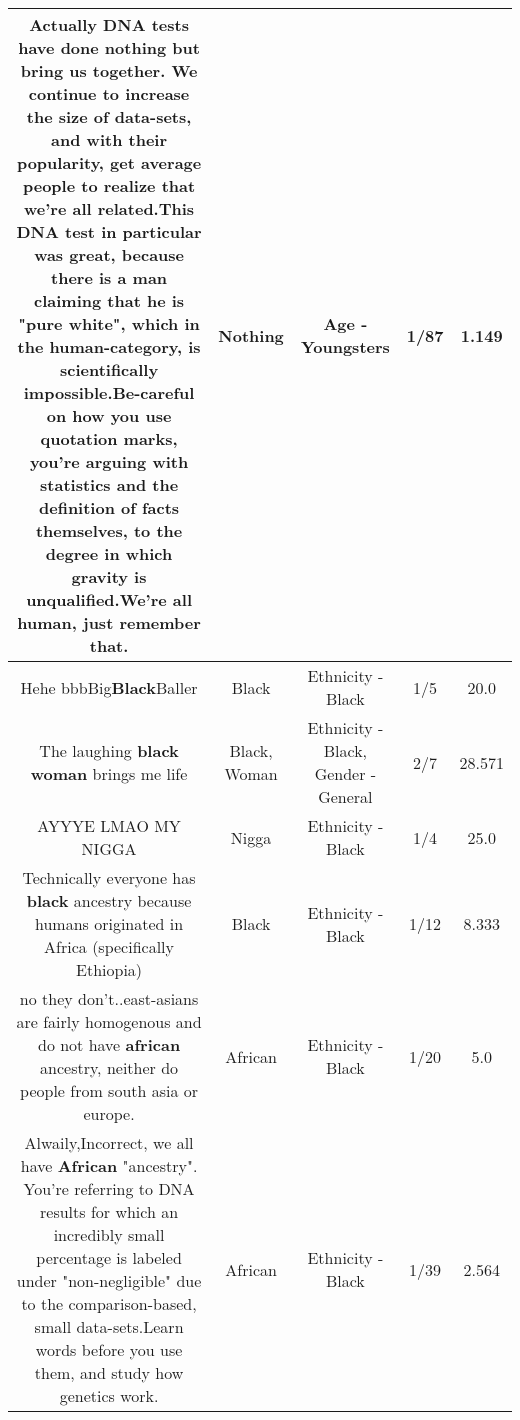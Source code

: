 \documentclass[11pt]{article}
\newlength\mylength
\begin{document}
\begin{center}
\begin{longtable}{|C{.65\mylength}|C{.30\mylength}|C{.12\mylength}|C{.12\mylength}|C{.12\mylength}|}
  \small Actually DNA tests have done \textbf{nothing} but bring us together. We continue to increase the size of data-sets, and with their popularity, get average people to realize that we're all related.This DNA test in particular was great, because there is a man claiming that he is "pure white", which in the human-category, is scientifically impossible.Be-careful on how you use quotation marks, you're arguing with statistics and the definition of facts themselves, to the degree in which gravity is unqualified.We're all human, just remember that.\normalsize   & Nothing & Age - Youngsters & 1/87 & 1.149 \\  \hline
  \small Hehe bbbBig\textbf{Black}Baller\normalsize   & Black & Ethnicity - Black & 1/5 & 20.0 \\  \hline
  \small The laughing \textbf{black} \textbf{woman} brings me life\normalsize   & Black, Woman & Ethnicity - Black, Gender - General & 2/7 & 28.571 \\  \hline
  \small AYYYE LMAO MY NIGGA\normalsize   & Nigga & Ethnicity - Black & 1/4 & 25.0 \\  \hline
  \small Technically everyone has \textbf{black} ancestry because humans originated in Africa (specifically Ethiopia)\normalsize   & Black & Ethnicity - Black & 1/12 & 8.333 \\  \hline
  \small no they don't..east-asians are fairly homogenous and do not have \textbf{african} ancestry, neither do people from south asia or europe.\normalsize   & African & Ethnicity - Black & 1/20 & 5.0 \\  \hline
  \small Alwaily,Incorrect, we all have \textbf{African} "ancestry". You're referring to DNA results for which an incredibly small percentage is labeled under "non-negligible" due to the comparison-based, small data-sets.Learn words before you use them, and study how genetics work.\normalsize   & African & Ethnicity - Black & 1/39 & 2.564 \\  \hline

\end{longtable}
\end{center}
\end{document}

